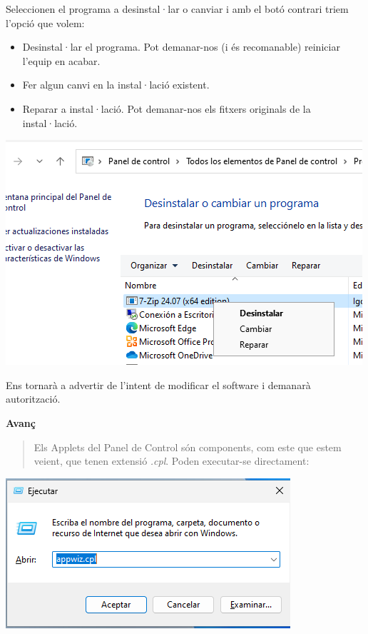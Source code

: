 \documentclass[
  a4paper,
]{article}
\providecommand{\tightlist}{%
  \setlength{\itemsep}{0pt}\setlength{\parskip}{0pt}}
\begin{document}
Seleccionen el programa a desinstal·lar o canviar i amb el botó contrari
triem l'opció que volem:

\begin{itemize}
\tightlist
\item
  Desinstal·lar el programa. Pot demanar-nos (i és recomanable)
  reiniciar l'equip en acabar.
\item
  Fer algun canvi en la instal·lació existent.
\item
  Reparar a instal·lació. Pot demanar-nos els fitxers originals de la
  instal·lació.
\end{itemize}

\includegraphics{png/programasycaracteristicasDesinstalar.png}

Ens tornarà a advertir de l'intent de modificar el software i demanarà
autorització.

\textbf{Avanç}

\begin{quote}
Els Applets del Panel de Control són components, com este que estem
veient, que tenen extensió \emph{.cpl}. Poden executar-se directament:
\end{quote}

\includegraphics{png/appwiz-cpl.png}
\end{document}

